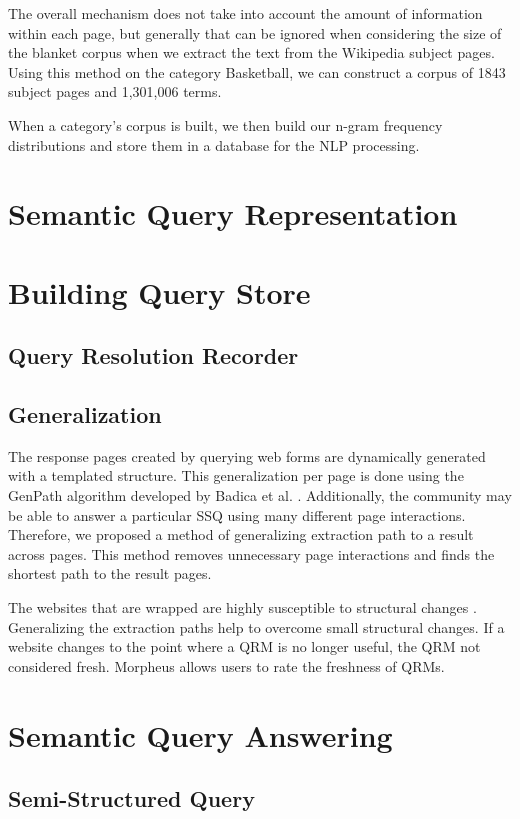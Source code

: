 \documentclass{www2010-submission}
\begin{document}
The overall mechanism does not take into account the amount of information within each page, but generally that can be ignored when considering the size of the blanket corpus when we extract the text from the Wikipedia subject pages. Using this method on the category Basketball, we can construct a corpus of 1843 subject pages and 1,301,006 terms.

When a category's corpus is built, we then build our n-gram frequency distributions and store them in a database for the NLP processing.



\section{Semantic Query Representation}

\section{Building Query Store}
\subsection{Query Resolution Recorder}
\subsection{Generalization}
The response pages created by querying web forms are dynamically generated with a templated structure. This generalization per page is done using the GenPath algorithm developed by Badica et al. \cite{Badica06}. Additionally, the community may be able to answer a particular SSQ using many different page interactions. Therefore, we proposed a method of generalizing extraction path to a result across pages. This method removes unnecessary page interactions and finds the shortest path to the result pages.

The websites that are wrapped are highly susceptible to structural changes \cite{TanZMG07}. Generalizing the extraction paths help to overcome small structural changes. If a website changes to the point where a QRM is no longer useful, the QRM not considered fresh. Morpheus allows users to rate the freshness of QRMs.


\section{Semantic Query Answering}
\subsection{Semi-Structured Query}
\end{document}
